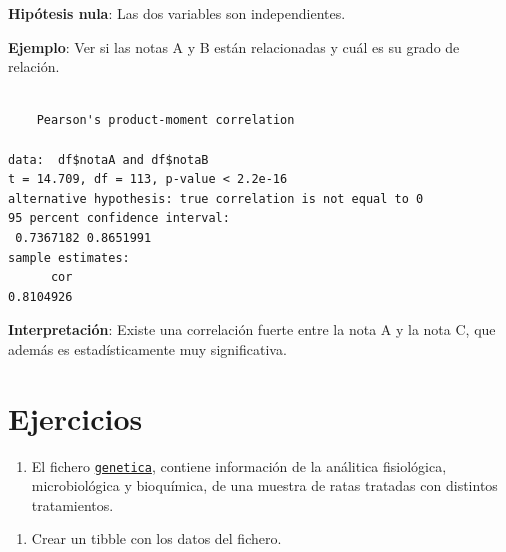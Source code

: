 \documentclass[
  a4paper,
]{scrreport}
\newenvironment{Shaded}{\begin{snugshade}}{\end{snugshade}}
\newcommand{\CommentTok}[1]{\textcolor[rgb]{0.37,0.37,0.37}{#1}}
\newcommand{\FunctionTok}[1]{\textcolor[rgb]{0.28,0.35,0.67}{#1}}
\newcommand{\NormalTok}[1]{\textcolor[rgb]{0.00,0.23,0.31}{#1}}
\newcommand{\SpecialCharTok}[1]{\textcolor[rgb]{0.37,0.37,0.37}{#1}}
\providecommand{\tightlist}{%
  \setlength{\itemsep}{0pt}\setlength{\parskip}{0pt}}\usepackage{longtable,booktabs,array}
\theoremstyle{definition}
\theoremstyle{definition}
\theoremstyle{remark}
\begin{document}
\textbf{Hipótesis nula}: Las dos variables son independientes.

\textbf{Ejemplo}: Ver si las notas A y B están relacionadas y cuál es su
grado de relación.

\begin{Shaded}
\end{Shaded}

\begin{verbatim}

    Pearson's product-moment correlation

data:  df$notaA and df$notaB
t = 14.709, df = 113, p-value < 2.2e-16
alternative hypothesis: true correlation is not equal to 0
95 percent confidence interval:
 0.7367182 0.8651991
sample estimates:
      cor 
0.8104926 
\end{verbatim}

\textbf{Interpretación}: Existe una correlación fuerte entre la nota A y
la nota C, que además es estadísticamente muy significativa.

\hypertarget{ejercicios-5}{%
\section{Ejercicios}\label{ejercicios-5}}

\begin{enumerate}
\def\labelenumi{\arabic{enumi}.}
\tightlist
\item
  El fichero
  \href{https://raw.githubusercontent.com/asalber/manual-r/master/datos/genetica.csv}{\texttt{genetica}},
  contiene información de la análitica fisiológica, microbiológica y
  bioquímica, de una muestra de ratas tratadas con distintos
  tratamientos.
\end{enumerate}

\begin{enumerate}
\def\labelenumi{\alph{enumi}.}
\tightlist
\item
  Crear un tibble con los datos del fichero.
\end{enumerate}
\end{document}
